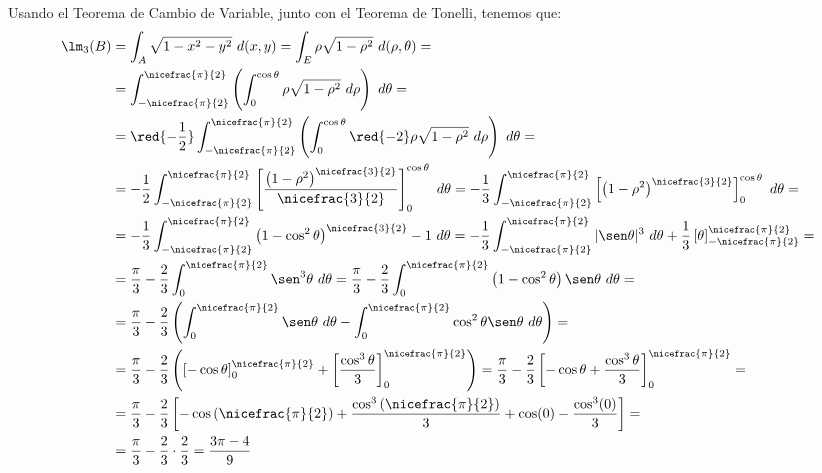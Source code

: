 \begin{ejercicio}
    Usando el Teorema de Cambio de Variable, junto con el Teorema de Tonelli, tenemos que:
    \begin{align*}
        \lm_3(B) &= \int_A \sqrt{1 - x^2 - y^2}~d(x, y) = \int_E \rho\sqrt{1 - \rho^2}~d(\rho, \theta) =\\
        &= \int_{-\nicefrac{\pi}{2}}^{\nicefrac{\pi}{2}} \left( \int_0^{\cos\theta} \rho\sqrt{1 - \rho^2}~d\rho \right)~d\theta =\\
        &= \red{-\frac{1}{2}}\int_{-\nicefrac{\pi}{2}}^{\nicefrac{\pi}{2}} \left( \int_0^{\cos\theta} \red{-2}\rho\sqrt{1 - \rho^2}~d\rho \right)~d\theta =\\
        &= {-\frac{1}{2}}\int_{-\nicefrac{\pi}{2}}^{\nicefrac{\pi}{2}} \left[ \dfrac{\left(1-\rho^2\right)^{\nicefrac{3}{2}}}{\nicefrac{3}{2}} \right]_0^{\cos\theta}~d\theta
        = {-\frac{1}{3}}\int_{-\nicefrac{\pi}{2}}^{\nicefrac{\pi}{2}} \left[ \left(1-\rho^2\right)^{\nicefrac{3}{2}} \right]_0^{\cos\theta}~d\theta =\\
        &= {-\frac{1}{3}}\int_{-\nicefrac{\pi}{2}}^{\nicefrac{\pi}{2}} \left(1-\cos^2\theta\right)^{\nicefrac{3}{2}} - 1~d\theta 
        = {-\frac{1}{3}}\int_{-\nicefrac{\pi}{2}}^{\nicefrac{\pi}{2}} |\sen\theta|^3~d\theta +\frac{1}{3} \left[\theta\right]_{-\nicefrac{\pi}{2}}^{\nicefrac{\pi}{2}} =\\
        &= \frac{\pi}{3} -\frac{2}{3}\int_{0}^{\nicefrac{\pi}{2}} \sen^3\theta~d\theta
        = \frac{\pi}{3} -\frac{2}{3}\int_{0}^{\nicefrac{\pi}{2}} \left(1-\cos^2\theta\right)\sen\theta~d\theta =\\
        &= \frac{\pi}{3} -\frac{2}{3}\left(\int_{0}^{\nicefrac{\pi}{2}} \sen\theta~d\theta - \int_{0}^{\nicefrac{\pi}{2}} \cos^2\theta\sen\theta~d\theta\right) =\\
        &= \frac{\pi}{3} -\frac{2}{3}\left(\left[-\cos\theta\right]_{0}^{\nicefrac{\pi}{2}} + \left[\dfrac{\cos^3\theta}{3}\right]_{0}^{\nicefrac{\pi}{2}}\right)
        = \frac{\pi}{3} -\frac{2}{3}\left[-\cos\theta + \dfrac{\cos^3\theta}{3}\right]_{0}^{\nicefrac{\pi}{2}} =\\
        &= \frac{\pi}{3} -\frac{2}{3}\left[-\cos\left(\nicefrac{\pi}{2}\right) + \dfrac{\cos^3\left(\nicefrac{\pi}{2}\right)}{3} + \cos(0) - \dfrac{\cos^3(0)}{3}\right] =\\
        &= \frac{\pi}{3} -\frac{2}{3}\cdot \frac{2}{3} = \dfrac{3\pi - 4}{9}
    \end{align*}
\end{ejercicio}
    

